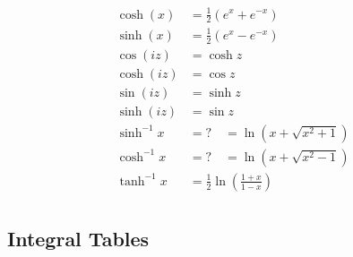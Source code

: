 \begin{align*}
\cosh(x)    & = \frac{1}{2}(e^x + e^{-x}) \\
\sinh(x)    & = \frac{1}{2}(e^x - e^{-x}) \\
\cos(iz)    & = \cosh z \\
\cosh(iz)   & = \cos z \\
\sin(iz)    & = \sinh z \\
\sinh(iz)   & = \sin z \\
\sinh^{-1}x & = ? \quad = \ln(x + \sqrt{x^2+1}) \\
\cosh^{-1}x & = ? \quad = \ln(x + \sqrt{x^2-1}) \\
\tanh^{-1}x & = \frac{1}{2}\ln(\frac{1+x}{1-x}) \\
\end{align*}

\hypertarget{integral-tables}{%
\subsection{Integral Tables}\label{integral-tables}}

